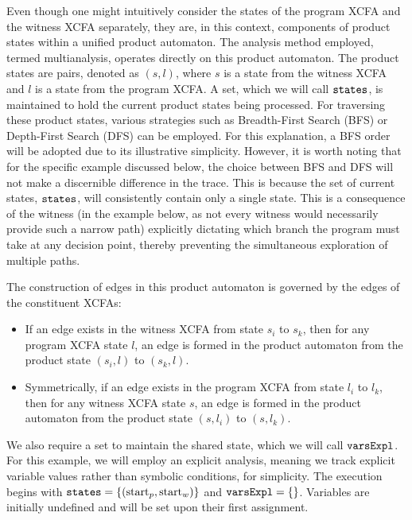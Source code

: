 Even though one might intuitively consider the states of the program XCFA and the witness XCFA
separately, they are, in this context, components of product states within a unified product
automaton. The analysis method employed, termed multianalysis, operates directly on this
product automaton. The product states are pairs, denoted as $(s, l)$, where $s$ is a state from the
witness XCFA and $l$ is a state from the program XCFA. A set, which we will call
$\text{\texttt{states}}$, is maintained to hold the current product states being processed.
For traversing these product states, various strategies such as Breadth-First Search (BFS) or
Depth-First Search (DFS) can be employed. For this explanation, a BFS order will be adopted
due to its illustrative simplicity. However, it is worth noting that for the specific example
discussed below, the choice between BFS and DFS will not make a discernible difference in the
trace. This is because the set of current states, $\text{\texttt{states}}$, will consistently
contain only a single state. This is a consequence of the witness (in the example below, as not
every witness would necessarily provide such a narrow path) explicitly dictating which branch the
program must take at any decision point, thereby preventing the simultaneous exploration of
multiple paths.

The construction of edges in this product automaton is governed by the edges of the constituent XCFAs:
\begin{itemize}
    \item If an edge exists in the witness XCFA from state $s_i$ to $s_k$, then for any program XCFA
    state $l$, an edge is formed in the product automaton from the product state $(s_i, l)$ to $(s_k, l)$.
    \item Symmetrically, if an edge exists in the program XCFA from state $l_i$ to $l_k$, then for
    any witness XCFA state $s$, an edge is formed in the product automaton from
    the product state $(s, l_i)$ to $(s, l_k)$.
\end{itemize}

We also require a set to maintain the shared state, which we will call $\text{\texttt{varsExpl}}$.
For this example, we will employ an explicit analysis, meaning we track explicit variable values
rather than symbolic conditions, for simplicity.
The execution begins with $\text{\texttt{states}} = \{ (\text{start}_p, \text{start}_w) \}$ and
$\text{\texttt{varsExpl}} = \{ \}$.
Variables are initially undefined and will be set upon their first assignment.

